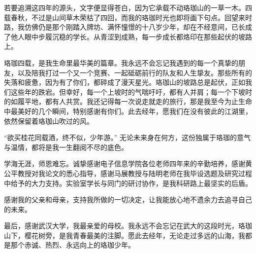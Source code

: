 \documentclass[type = bachelor]{whu-thesis}
\begin{document}
\begin{acknowledgements}
  若要追溯这四年的源头，文字便显得苍白，因为它承载不动珞珈山的一草一木。四载春秋，不过是山间草木荣枯了四回，而我的珞珈时光也即将画下句点。回望来时路，我仿佛仍是那个刚踏入牌坊、满怀憧憬的十八岁少年，却在不经意间，已长成了他人眼中步履沉稳的学长。从青涩到成熟，每一步成长都烙印在那些起伏的坡路上。

  珞珈四载，是我生命里最华美的篇章。我永远不会忘记我遇到的每一个真挚的朋友，以及陪我打过一个又一个竞赛、一起砥砺前行的队友和人生挚友。那些所有的失落和疲惫，因为有了你们，都碎成了漫天星光。珞珈山的坡路总是起伏，正如我们这些年的跌宕。但幸好，每一个上坡时的气喘吁吁，都有人并肩；每一个下坡时的如履平地，都有人共赏。我还记得每一次说走就走的旅行，那是我至今为止生命中最美好的几个瞬间，特别感谢有你们。此去经年，愿我们在没有彼此的江湖里，依然保留着珞珈山吹过的风。

  “欲买桂花同载酒，终不似，少年游。” 无论未来身在何方，这份独属于珞珈的意气与温情，都将是我一生翻阅不尽的底色。

  学海无涯，师恩难忘。诚挚感谢电子信息学院各位老师四年来的辛勤培养，感谢黄公平教授对我论文的悉心指导，感谢马展教授与陆明老师在我毕设选题及研究过程中给予的大力支持。实验室学长与同门的研讨协作，是我科研路上最坚实的后盾。

  感谢我的父亲和母亲，支持我所做的一切决定，让我能放心地不遗余力去追寻自己的未来。

  最后，感谢武汉大学，我最亲爱的母校。我永远不会忘记在武大的这段时光，珞珈山下，樱花树旁，是我青春最美的注脚。愿此去经年，无论走过多远的山海，我都是那个赤诚、热烈、永远向上的珞珈少年。
\end{acknowledgements}

\appendix

\end{document}
